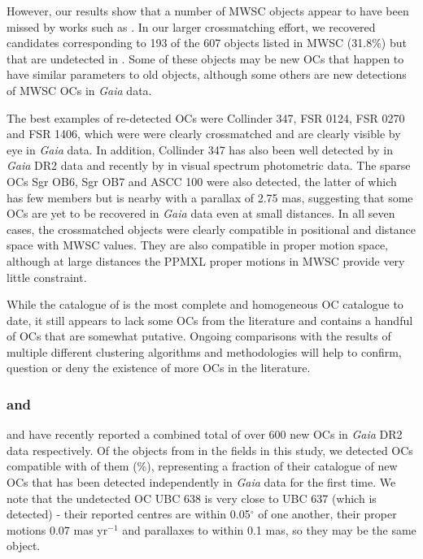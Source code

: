 However, our results show that a number of MWSC objects appear to have been missed by works such as \cite{cantat-gaudin_clusters_2020}. In our larger crossmatching effort, we recovered candidates corresponding to 193 of the 607 objects listed in MWSC (31.8\%) but that are undetected in \cite{cantat-gaudin_clusters_2020}. Some of these objects may be new OCs that happen to have similar parameters to old objects, although some others are new detections of MWSC OCs in \emph{Gaia} data.

The best examples of re-detected OCs were Collinder 347, FSR 0124, FSR 0270 and FSR 1406, which were were clearly crossmatched and are clearly visible by eye in \emph{Gaia} data. In addition, Collinder 347 has also been well detected by \cite{piatti_extended_2019} in \emph{Gaia} DR2 data and recently by \cite{claria_ccd_2019} in visual spectrum photometric data. The sparse OCs Sgr OB6, Sgr OB7 and ASCC 100 were also detected, the latter of which has few members but is nearby with a parallax of 2.75 mas, suggesting that some OCs are yet to be recovered in \emph{Gaia} data even at small distances. In all seven cases, the crossmatched objects were clearly compatible in positional and distance space with MWSC values. They are also compatible in proper motion space, although at large distances the PPMXL proper motions in MWSC provide very little constraint.

While the catalogue of \cite{cantat-gaudin_clusters_2020} is the most complete and homogeneous OC catalogue to date, it still appears to lack some OCs from the literature and contains a handful of OCs that are somewhat putative. Ongoing comparisons with the results of multiple different clustering algorithms and methodologies will help to confirm, question or deny the existence of more OCs in the literature.


\subsubsection{\cite{castro-ginard_hunting_2020} and \cite{liu_catalog_2019}}

\cite{castro-ginard_hunting_2020} and \cite{liu_catalog_2019} have recently reported a combined total of over 600 new OCs in \emph{Gaia} DR2 data respectively. Of the objects from \cite{castro-ginard_hunting_2020} in the fields in this study, we detected OCs compatible with of them (\%), representing a fraction of their catalogue of new OCs that has been detected independently in \emph{Gaia} data for the first time. We note that the undetected OC UBC 638 is very close to UBC 637 (which is detected) - their reported centres are within 0.05$^{\circ}$ of one another, their proper motions 0.07 mas yr$^{-1}$ and parallaxes to within 0.1 mas, so they may be the same object.

